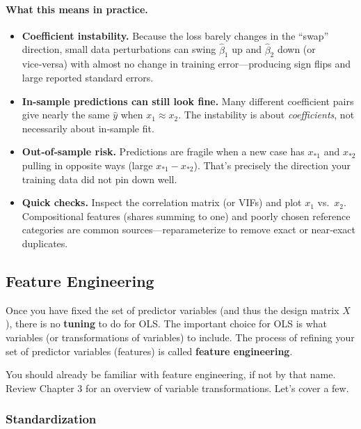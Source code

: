 \paragraph{What this means in practice.}
\begin{itemize}\itemsep0.2em
\item \textbf{Coefficient instability.} Because the loss barely changes in the ``swap'' direction, small data perturbations can swing $\hat\beta_1$ up and $\hat\beta_2$ down (or vice‑versa) with almost no change in training error—producing sign flips and large reported standard errors.
\item \textbf{In‑sample predictions can still look fine.} Many different coefficient pairs give nearly the same $\hat y$ when $x_1\approx x_2$. The instability is about \emph{coefficients}, not necessarily about in‑sample fit.
\item \textbf{Out‑of‑sample risk.} Predictions are fragile when a new case has $x_{*1}$ and $x_{*2}$ pulling in opposite ways (large $x_{*1}-x_{*2}$). That’s precisely the direction your training data did not pin down well.
\item \textbf{Quick checks.} Inspect the correlation matrix (or VIFs) and plot $x_1$ vs.\ $x_2$. Compositional features (shares summing to one) and poorly chosen reference categories are common sources—reparameterize to remove exact or near‑exact duplicates.
\end{itemize}




\subsection{Feature Engineering}

Once you have fixed the set of predictor variables (and thus the design matrix $X$), there is no \textbf{tuning} to do for OLS. The important choice for OLS is what variables (or transformations of variables) to include. The process of refining your set of predictor variables (features) is called \textbf{feature engineering}.

You should already be familiar with feature engineering, if not by that name. Review \cite{kuhn2013applied} Chapter 3 for an overview of variable transformations. Let's cover a few.

\subsubsection{Standardization}

